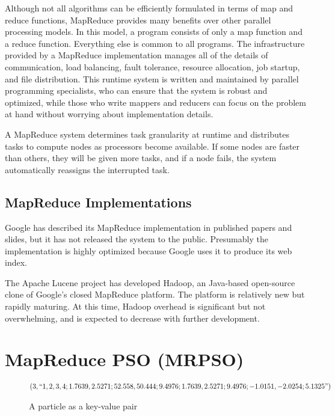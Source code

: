 \documentclass[letterpaper]{sig-alternate}
\begin{document}
Although not all algorithms can be efficiently formulated in terms of map and
reduce functions, MapReduce provides many benefits over other parallel
processing models.  In this model, a program consists of only a map function
and a reduce function.  Everything else is common to all programs.  The
infrastructure provided by a MapReduce implementation manages all of the
details of communication, load balancing, fault tolerance, resource
allocation, job startup, and file distribution.  This runtime system is
written and maintained by parallel programming specialists, who can ensure
that the system is robust and optimized, while those who write mappers and
reducers can focus on the problem at hand without worrying about
implementation details.

A MapReduce system determines task granularity at runtime and
distributes tasks to compute nodes as processors become available.  If some
nodes are faster than others, they will be given more tasks, and if a node
fails, the system automatically reassigns the interrupted task.

\subsection{MapReduce Implementations}

Google has described its MapReduce implementation in published papers and
slides, but it has not released the system to the public.  Presumably the
implementation is highly optimized because Google uses it to produce its web
index.

The Apache Lucene project has developed Hadoop, an Java-based open-source
clone of Google's closed MapReduce platform.  The platform is relatively new
but rapidly maturing.  At this time, Hadoop overhead is significant but not
overwhelming, and is expected to decrease with further development.


\section{MapReduce PSO (MRPSO)}
\label{sec:mrpso}

\begin{figure*}
\begin{align*}
(3, ``1,2,3,4;1.7639,2.5271;52.558,50.444;9.4976;1.7639,2.5271;9.4976;-1.0151,-2.0254;5.1325")
\end{align*}
\caption{A particle as a key-value pair}
\label{fig:sample-particle}
\end{figure*}
\end{document}
